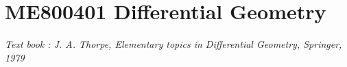 
\chapter{ME800401 Differential Geometry}
\textit{Text book : J. A. Thorpe, Elementary topics in Differential Geometry, Springer, 1979}
